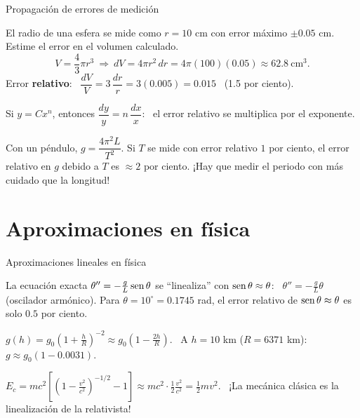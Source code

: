 \documentclass[10pt,aspectratio=169]{beamer}
\begin{document}
\begin{frame}{Propagación de errores de medición}
  \small
  \begin{ejemplo}[4]
    El radio de una esfera se mide como $r=10$ cm con error máximo $\pm0.05$ cm. Estime el error en el volumen calculado.
    \[ V=\frac43\pi r^3\ \Rightarrow\ dV=4\pi r^2\,dr=4\pi(100)(0.05)\approx62.8\ \text{cm}^3. \]
    Error \textbf{relativo}: \ $\dfrac{dV}{V}=3\,\dfrac{dr}{r}=3(0.005)=0.015$ \ (1.5 por ciento).
  \end{ejemplo}
  \begin{proposicion}
    Si $y=Cx^n$, entonces $\dfrac{dy}{y}=n\,\dfrac{dx}{x}$: \ el error relativo se multiplica por el exponente.
  \end{proposicion}
  \begin{ejemplo}[5: laboratorio]
    Con un péndulo, $g=\dfrac{4\pi^2L}{T^2}$. Si $T$ se mide con error relativo $1$ por ciento, el error relativo en $g$ debido a $T$ es
    $\approx2$ por ciento. ¡Hay que medir el periodo con más cuidado que la longitud!
  \end{ejemplo}
\end{frame}

\section{Aproximaciones en física}

\begin{frame}{Aproximaciones lineales en física}
  \begin{ejemplo}[6: péndulo]
    La ecuación exacta $\theta''=-\frac gL\operatorname{sen}\theta$ se ``linealiza'' con $\operatorname{sen}\theta\approx\theta$: \ $\theta''=-\frac gL\theta$ (oscilador armónico).
    Para $\theta=10^\circ=0.1745$ rad, el error relativo de $\operatorname{sen}\theta\approx\theta$ es solo $0.5$ por ciento.
  \end{ejemplo}
  \begin{ejemplo}
    $g(h)=g_0\left(1+\frac hR\right)^{-2}\approx g_0\left(1-\frac{2h}{R}\right)$. \ A $h=10$ km ($R=6371$ km): \ $g\approx g_0(1-0.0031)$.
  \end{ejemplo}
  \begin{ejemplo}[8: relatividad]
    $E_c=mc^2\left[\left(1-\frac{v^2}{c^2}\right)^{-1/2}-1\right]\approx mc^2\cdot\frac12\frac{v^2}{c^2}=\frac12mv^2$. \
    ¡La mecánica clásica es la linealización de la relativista!
  \end{ejemplo}
\end{frame}
\end{document}
